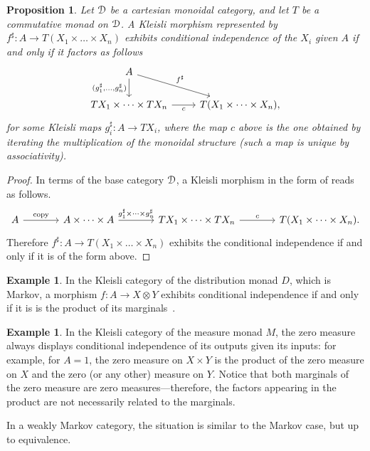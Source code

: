 \documentclass[a4paper,UKenglish,numberwithinsect,cleveref, autoref, thm-restate]{lipics-v2021}
\theoremstyle{plain} %
\newtheorem{myproposition}[mytheorem]{Proposition}
\theoremstyle{definition} %
\newtheorem{myexample}[mytheorem]{Example}
\begin{document}
\begin{myproposition}\label{indepkleisli}
 Let $\mathcal{D}$ be a cartesian monoidal category, and let $T$ be a commutative monad on $\mathcal{D}$.
 A Kleisli morphism represented by $f^\sharp:A\to T(X_1\times\dots\times X_n)$ exhibits conditional independence of the $X_i$ given $A$ if and only if it factors as follows
 \[
 \begin{tikzcd}
  A \ar{d}[swap]{(g_1^\sharp,\dots,g_n^\sharp)} \ar{dr}{f^\sharp} \\
  TX_1\times\dots\times TX_n \ar{r}[swap]{c} & T(X_1\times\dots\times X_n) ,
 \end{tikzcd}
 \]
 for some Kleisli maps $g_i^\sharp:A\to TX_i$,
 where the map $c$ above is the one obtained by iterating the multiplication of the monoidal structure (such a map is unique by associativity). 
\end{myproposition}
\begin{proof}
 In terms of the base category $\mathcal{D}$, a Kleisli morphism in the form of  reads as follows.
 \[
  \begin{tikzcd}[sep=large]
   A \ar{r}{\mathrm{copy}} & A\times\dots\times A \ar{r}{g_1^\sharp\times\dots\times g_n^\sharp} & TX_1\times\dots\times TX_n \ar{r}{c} & T(X_1\times\dots\times X_n) .
  \end{tikzcd}
 \]
 Therefore $f^\sharp:A\to T(X_1\times\dots\times X_n)$ exhibits the conditional independence if and only if it is of the form above.
\end{proof}

\begin{myexample}
 In the Kleisli category of the distribution monad $D$, which is Markov, a morphism $f:A\to X\otimes Y$ exhibits conditional independence if and only if it is is the product of its marginals~\cite[Section~12]{Fritz_2020}.
\end{myexample}

\begin{myexample}
 In the Kleisli category of the measure monad $M$, the zero measure always displays conditional independence of its outputs given its inputs: for example, for $A=1$, the zero measure on $X\times Y$ is the product of the zero measure on $X$ and the zero (or any other) measure on $Y$.
 Notice that both marginals of the zero measure are zero measures---therefore, the factors appearing in the product are not necessarily related to the marginals.
\end{myexample}

In a weakly Markov category, the situation is similar to the Markov case, but up to equivalence. 
\end{document}
